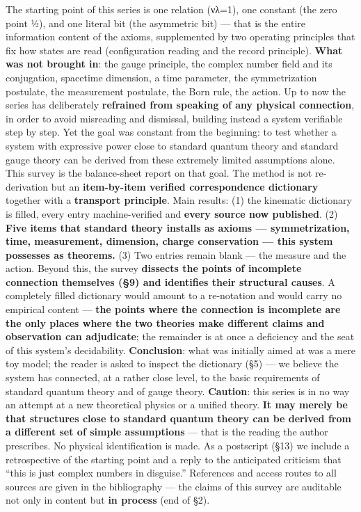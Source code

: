 \documentclass[
]{article}
\begin{document}
The starting point of this series is one relation (νλ=1), one constant
(the zero point ½), and one literal bit (the asymmetric bit) --- that is
the entire information content of the axioms, supplemented by two
operating principles that fix how states are read (configuration reading
and the record principle). \textbf{What was not brought in}: the gauge
principle, the complex number field and its conjugation, spacetime
dimension, a time parameter, the symmetrization postulate, the
measurement postulate, the Born rule, the action. Up to now the series
has deliberately \textbf{refrained from speaking of any physical
connection}, in order to avoid misreading and dismissal, building
instead a system verifiable step by step. Yet the goal was constant from
the beginning: to test whether a system with expressive power close to
standard quantum theory and standard gauge theory can be derived from
these extremely limited assumptions alone. This survey is the
balance-sheet report on that goal. The method is not re-derivation but
an \textbf{item-by-item verified correspondence dictionary} together
with a \textbf{transport principle}. Main results: (1) the kinematic
dictionary is filled, every entry machine-verified and \textbf{every
source now published}. (2) \textbf{Five items that standard theory
installs as axioms --- symmetrization, time, measurement, dimension,
charge conservation --- this system possesses as theorems.} (3) Two
entries remain blank --- the measure and the action. Beyond this, the
survey \textbf{dissects the points of incomplete connection themselves
(§9) and identifies their structural causes}. A completely filled
dictionary would amount to a re-notation and would carry no empirical
content --- \textbf{the points where the connection is incomplete are
the only places where the two theories make different claims and
observation can adjudicate}; the remainder is at once a deficiency and
the seat of this system's decidability. \textbf{Conclusion}: what was
initially aimed at was a mere toy model; the reader is asked to inspect
the dictionary (§5) --- we believe the system has connected, at a rather
close level, to the basic requirements of standard quantum theory and of
gauge theory. \textbf{Caution}: this series is in no way an attempt at a
new theoretical physics or a unified theory. \textbf{It may merely be
that structures close to standard quantum theory can be derived from a
different set of simple assumptions} --- that is the reading the author
prescribes. No physical identification is made. As a postscript (§13) we
include a retrospective of the starting point and a reply to the
anticipated criticism that ``this is just complex numbers in disguise.''
References and access routes to all sources are given in the
bibliography --- the claims of this survey are auditable not only in
content but \textbf{in process} (end of §2).
\end{document}
